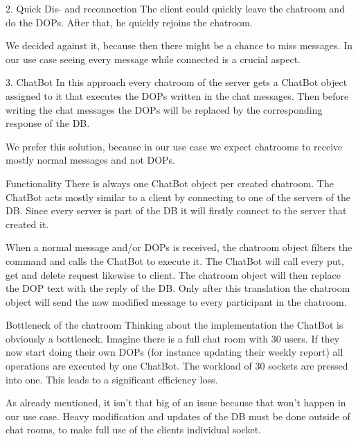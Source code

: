 2.	Quick Dis- and reconnection
The client could quickly leave the chatroom and do the DOPs. After that, he quickly rejoins the chatroom.

We decided against it, because then there might be a chance to miss messages. In our use case seeing every message while connected is a crucial aspect.

3.	ChatBot
In this approach every chatroom of the server gets a ChatBot object assigned to it that executes the DOPs written in the chat messages. Then before writing the chat messages the DOPs will be replaced by the corresponding response of the DB. 

We prefer this solution, because in our use case we expect chatrooms to receive mostly normal messages and not DOPs. 

Functionality
There is always one ChatBot object per created chatroom. The ChatBot acts mostly similar to a client by connecting to one of the servers of the DB. Since every server is part of the DB it will firstly connect to the server that created it. 

When a normal message and/or DOPs is received, the chatroom object filters the command and calls the ChatBot to execute it. The ChatBot will call every put, get and delete request likewise to client. The chatroom object will then replace the DOP text with the reply of the DB. Only after this translation the chatroom object will send the now modified message to every participant in the chatroom.

Bottleneck of the chatroom
Thinking about the implementation the ChatBot is obviously a bottleneck. Imagine there is a full chat room with 30 users. If they now start doing their own DOPs (for instance updating their weekly report) all operations are executed by one ChatBot. The workload of 30 sockets are pressed into one. This leads to a significant efficiency loss.

As already mentioned, it isn’t that big of an issue because that won’t happen in our use case. Heavy modification and updates of the DB must be done outside of chat rooms, to make full use of the clients individual socket.

